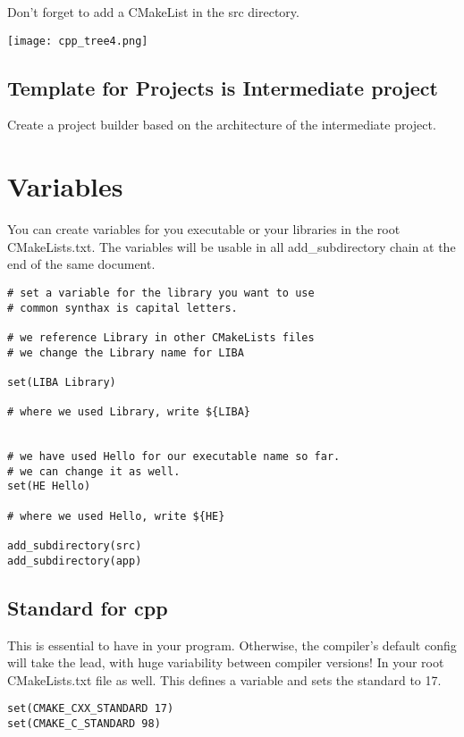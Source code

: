 Don't forget to add a CMakeList in the src directory.


\begin{center}
    \texttt{[image: cpp\_tree4.png]}
\end{center}


\subsection{Template for Projects is Intermediate project}

Create a project builder based on the architecture of the intermediate project.


\section{Variables}

You can create variables for you executable or your libraries in the root CMakeLists.txt. The variables
will be usable in all add\_subdirectory chain at the end of the same document.

\begin{verbatim}
# set a variable for the library you want to use
# common synthax is capital letters.

# we reference Library in other CMakeLists files
# we change the Library name for LIBA

set(LIBA Library)

# where we used Library, write ${LIBA}


# we have used Hello for our executable name so far.
# we can change it as well.
set(HE Hello)

# where we used Hello, write ${HE}

add_subdirectory(src)
add_subdirectory(app)
\end{verbatim}


\subsection{Standard for cpp}

This is essential to have in your program. Otherwise, the compiler's default config will take the lead, with huge
variability between compiler versions!
In your root CMakeLists.txt file as well. This defines a variable and sets the standard to 17.

\begin{verbatim}
set(CMAKE_CXX_STANDARD 17)
set(CMAKE_C_STANDARD 98)
\end{verbatim}

